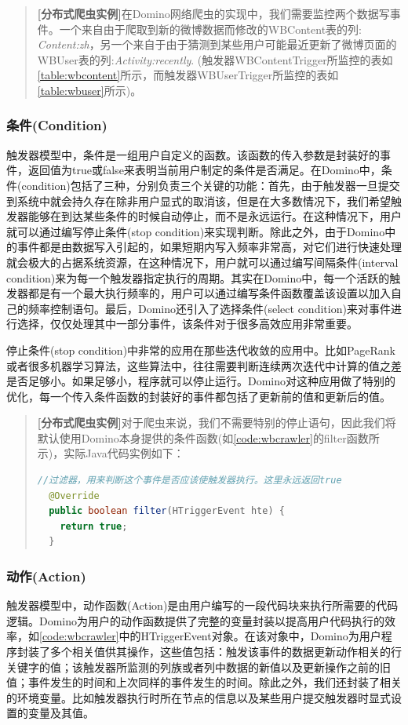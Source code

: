 \begin{quotation}
\textbf{[分布式爬虫实例]}在Domino网络爬虫的实现中，我们需要监控两个数据写事件。一个来自由于爬取到新的微博数据而修改的WBContent表的列: \textit{Content:zh}，另一个来自于由于猜测到某些用户可能最近更新了微博页面的WBUser表的列:\textit{Activity:recently}. (触发器WBContentTrigger所监控的表如\ref{table:wbcontent}所示，而触发器WBUserTrigger所监控的表如\ref{table:wbuser}所示)。
\end{quotation}


\subsubsection{条件(Condition)}
触发器模型中，条件是一组用户自定义的函数。该函数的传入参数是封装好的事件，返回值为true或false来表明当前用户制定的条件是否满足。在Domino中，条件(condition)包括了三种，分别负责三个关键的功能：首先，由于触发器一旦提交到系统中就会持久存在除非用户显式的取消该，但是在大多数情况下，我们希望触发器能够在到达某些条件的时候自动停止，而不是永远运行。在这种情况下，用户就可以通过编写停止条件(stop condition)来实现判断。除此之外，由于Domino中的事件都是由数据写入引起的，如果短期内写入频率非常高，对它们进行快速处理就会极大的占据系统资源，在这种情况下，用户就可以通过编写间隔条件(interval condition)来为每一个触发器指定执行的周期。其实在Domino中，每一个活跃的触发器都是有一个最大执行频率的，用户可以通过编写条件函数覆盖该设置以加入自己的频率控制语句。最后，Domino还引入了选择条件(select condition)来对事件进行选择，仅仅处理其中一部分事件，该条件对于很多高效应用非常重要。

停止条件(stop condition)中非常的应用在那些迭代收敛的应用中。比如PageRank或者很多机器学习算法，这些算法中，往往需要判断连续两次迭代中计算的值之差是否足够小。如果足够小，程序就可以停止运行。Domino对这种应用做了特别的优化，每一个传入条件函数的封装好的事件都包括了更新前的值和更新后的值。

\begin{quotation}
\textbf{[分布式爬虫实例]}对于爬虫来说，我们不需要特别的停止语句，因此我们将默认使用Domino本身提供的条件函数(如\ref{code:wbcrawler}的filter函数所示)，实际Java代码实例如下：
\begin{lstlisting}[language=java]
  //过滤器，用来判断这个事件是否应该使触发器执行。这里永远返回true
  @Override
  public boolean filter(HTriggerEvent hte) {
    return true;
  }
\end{lstlisting}
\end{quotation}

\subsubsection{动作(Action)}
触发器模型中，动作函数(Action)是由用户编写的一段代码块来执行所需要的代码逻辑。Domino为用户的动作函数提供了完整的变量封装以提高用户代码执行的效率，如\ref{code:wbcrawler}中的HTriggerEvent对象。在该对象中，Domino为用户程序封装了多个相关值供其操作，这些值包括：触发该事件的数据更新动作相关的行关键字的值；该触发器所监测的列族或者列中数据的新值以及更新操作之前的旧值；事件发生的时间和上次同样的事件发生的时间。除此之外，我们还封装了相关的环境变量。比如触发器执行时所在节点的信息以及某些用户提交触发器时显式设置的变量及其值。

